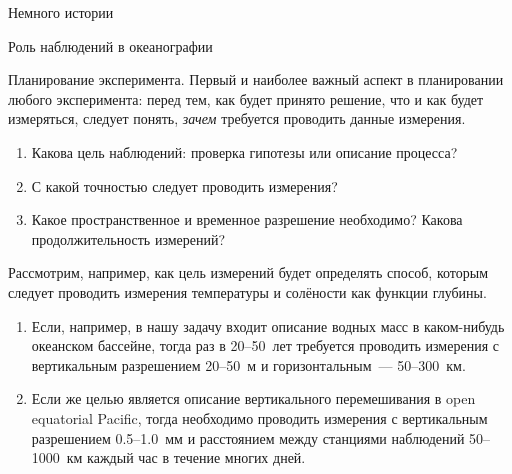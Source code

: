 \begin{chapter}{Немного истории}
\begin{section}{Роль наблюдений в океанографии}
\begin{paragraph}{Планирование эксперимента.}
Первый и наиболее важный аспект в планировании любого эксперимента:
перед тем, как будет принято решение, что и как будет измеряться, 
следует понять, \emph{зачем} требуется проводить данные измерения.

\begin{enumerate}
\item 
Какова цель наблюдений: проверка гипотезы или описание процесса?
%

\item 
С какой точностью следует проводить измерения?
%

\item
Какое пространственное и временное разрешение необходимо? Какова
продолжительность измерений?
%
\end{enumerate}

Рассмотрим, например, как цель измерений будет определять способ, которым
следует проводить измерения температуры и солёности как функции глубины.
%

\begin{enumerate}
\item
Если, например, в нашу задачу входит описание водных масс в каком-нибудь 
океанском бассейне, тогда раз в 20--50~лет требуется проводить измерения
с вертикальным разрешением 20--50~м и горизонтальным~--- 50--300~км.
%

\item
Если же целью является описание вертикального перемешивания 
в open equatorial Pacific,
тогда необходимо проводить измерения с вертикальным разрешением
0.5--1.0~мм и расстоянием между станциями наблюдений 50--1000~км
каждый час в течение многих дней.
%
\end{enumerate}
\end{paragraph}


\end{section}
\end{chapter}
